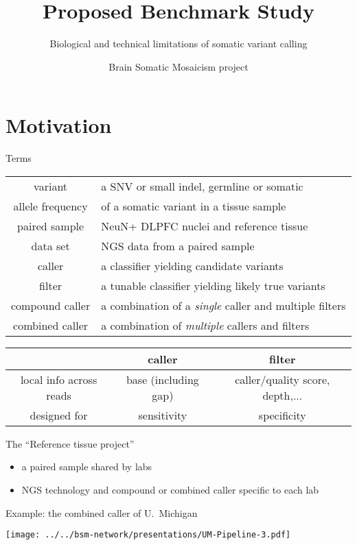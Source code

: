 \documentclass{beamer}
\title{Proposed Benchmark Study}
\subtitle{Biological and technical limitations of somatic variant calling}
\author{Brain Somatic Mosaicism project}
\date{}
\begin{document}
\maketitle

\section{Motivation}

\begin{frame}{Terms}
\small
\begin{tabular}{c|l}
variant & a SNV or small indel, germline or somatic \\
allele frequency & of a somatic variant in a tissue sample \\
paired sample & NeuN+ DLPFC nuclei and reference tissue \\
data set & NGS data from a paired sample \\
caller & a classifier yielding candidate variants \\
filter & a tunable classifier yielding likely true variants \\
compound caller & a combination of a \emph{single} caller and multiple filters \\
combined caller & a combination of \emph{multiple} callers and filters \\
\end{tabular}

\vfill

\begin{tabular}{c|c|c}
 & caller & filter \\
\hline
local info across reads & base (including gap) & caller/quality score, depth,... \\
designed for & sensitivity & specificity \\
\end{tabular}
\end{frame}

\begin{frame}{The ``Reference tissue project''}
\begin{itemize}
\item a paired sample shared by labs
\item NGS technology and compound or combined caller specific to each lab
\end{itemize}
\end{frame}

\begin{frame}{Example: the combined caller of U.~Michigan}
\begin{center}
\texttt{[image: ../../bsm-network/presentations/UM-Pipeline-3.pdf]}
\end{center}
\end{frame}
\end{document}

